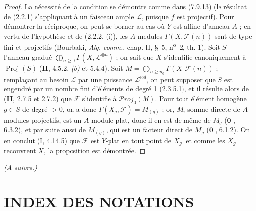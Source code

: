\begin{proof}
La nécessité de la condition se démontre comme dans (7.9.13) (le résultat de
(2.2.1) s'appliquant à un faisceau ample $\mathscr L$, puisque $f$ est
projectif). Pour démontrer la réciproque, on peut se borner au cas où $Y$ est
affine d'anneau $A$ ; en vertu de l'hypothèse et de (2.2.2, (i)), les
$A$-modules $\Gamma(X,\mathscr F(n))$ sont de type fini et projectifs (Bourbaki,
\emph{Alg. comm.}, chap. II, \S~5, n\textsuperscript{o}~2, th. 1). Soit $S$
l'anneau gradué $\bigoplus_{n\geq0}\Gamma(X,\mathscr L^{\otimes n})$ ;
on sait que $X$ s'identifie canoniquement à $\operatorname{Proj}(S)$ (\textbf{II},
4.5.2, \emph{(b)} et 5.4.4). Soit
$M=\bigoplus_{n\geq n_0}\Gamma(X,\mathscr F(n))$ ;
remplaçant au besoin $\mathscr L$ par une puissance $\mathscr L^{\otimes d}$,
on peut supposer que $S$ est engendré par un nombre fini d'éléments de degré 1
(2.3.5.1), et il résulte alors de (\textbf{II}, 2.7.5 et 2.7.2) que $\mathscr F$
s'identifie à $\mathscr P\!roj_0(M)$. Pour tout élément homogène $g\in S$ de
degré $>0$, on a donc $\Gamma(X_g,\mathscr F)=M_{(g)}$ ; or, $M$, somme directe
de $A$-modules projectifs, est un $A$-module plat, donc il en est de même de
$M_g$ ($\mathbf{0}_{\mathrm I}$, 6.3.2), et par suite aussi de $M_{(g)}$, qui est un
facteur direct de $M_g$ ($\mathbf{0}_{\mathrm I}$, 6.1.2). On en conclut (I, 4.14.5) que
$\mathscr F$ est $Y$-plat en tout point de $X_g$, et comme les $X_g$ recouvrent
$X$, la proposition est démontrée.
\end{proof}

\bigskip
\noindent\emph{(A suivre.)}

\clearpage
{}
\section*{INDEX DES NOTATIONS}

